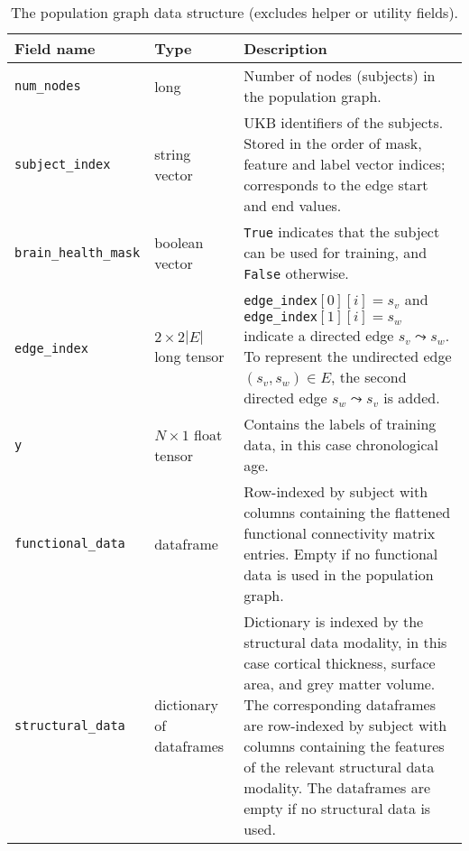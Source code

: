 \begin{table}[]
    \caption{The population graph data structure (excludes helper or utility fields).}\label{table:population-graph}
    \centering
    \begin{tabular}{lp{}p{}}
        \hline
    \centering
    \textbf{Field name} & \textbf{Type} & \textbf{Description} \\ \hline
    \texttt{num\_nodes} & long & Number of nodes (subjects) in the population graph. \\
    \texttt{subject\_index} & string vector & UKB identifiers of the subjects. Stored in the order of mask, feature and label vector indices; corresponds to the edge start and end values. \\
    \texttt{brain\_health\_mask} & boolean vector & \texttt{True} indicates that the subject can be used for training, and \texttt{False} otherwise. \\
    \texttt{edge\_index} & $2\times 2|E|$ \hfill\newline long tensor & \texttt{edge\_index}$[0][i]=s_v$ and \hfill \newline \texttt{edge\_index}$[1][i]=s_w$ indicate a directed \hfill \newline edge $s_v \leadsto s_w$. To represent the undirected edge $(s_v, s_w) \in E$, the second directed edge $s_w \leadsto s_v$ is added. \\
    \texttt{y} & $N \times 1$ \hfill \newline float tensor & Contains the labels of training data, in this case chronological age. \\
    \texttt{functional\_data} & dataframe & Row-indexed by subject with columns containing the flattened functional connectivity matrix entries. Empty if no functional data is used in the population graph. \\
    \texttt{structural\_data} & dictionary of \hfill \newline dataframes & Dictionary is indexed by the structural data modality, in this case cortical thickness, surface area, and grey matter volume. The corresponding dataframes are row-indexed by subject with columns containing the features of the relevant structural data modality. The dataframes are empty if no structural data is used. \\

\end{tabular}
\end{table}
